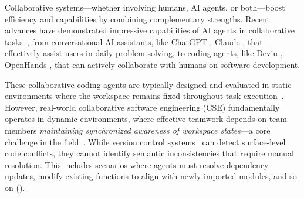 Collaborative systems---whether involving humans, AI agents, or both---boost efficiency and capabilities by combining complementary strengths.
% 
Recent advances have demonstrated impressive capabilities of AI agents in collaborative tasks~\cite{unleashing2024}, from conversational AI assistants, like ChatGPT \cite{ai_assistant_chatgpt}, Claude \cite{ai_assistant_claude}, that effectively assist users in daily problem-solving, to coding agents, like Devin \cite{ai_assistant_devin}, OpenHands \cite{OpenHands}, that can actively collaborate with humans on software development. 




These collaborative coding agents are typically designed and evaluated in static environments where the workspace remains fixed throughout task execution~\cite{jimenez2023swe, yang2024swe}. 
% 
However, real-world collaborative software engineering (CSE) fundamentally operates in dynamic environments, where effective teamwork depends on team members \textit{maintaining synchronized awareness of workspace states}—a core challenge in the field~\cite{agent_alignment}.
% 
While version control systems~\cite{version_control_git} can detect surface-level code conflicts, they cannot identify semantic inconsistencies that require manual resolution. This includes scenarios where agents must resolve dependency updates, modify existing functions to align with newly imported modules, and so on ().





